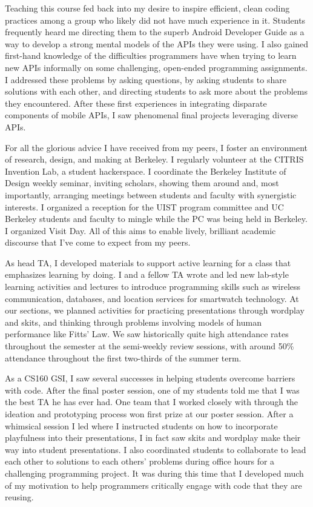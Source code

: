 \documentclass[12pt]{memoir}
\begin{document}
Teaching this course fed back into my desire to inspire efficient, clean coding practices among a group who likely did not have much experience in it.
Students frequently heard me directing them to the superb Android Developer Guide as a way to develop a strong mental models of the APIs they were using.
I also gained first-hand knowledge of the difficulties programmers have when trying to learn new APIs informally on some challenging, open-ended programming assignments.
I addressed these problems by asking questions, by asking students to share solutions with each other, and directing students to ask more about the problems they encountered.
After these first experiences in integrating disparate components of mobile APIs, I saw phenomenal final projects leveraging diverse APIs.

For all the glorious advice I have received from my peers, I foster an environment of research, design, and making at Berkeley.
I regularly volunteer at the CITRIS Invention Lab, a student hackerspace.
I coordinate the Berkeley Institute of Design weekly seminar, inviting scholars, showing them around and, most importantly, arranging meetings between students and faculty with synergistic interests.
I organized a reception for the UIST program committee and UC Berkeley students and faculty to mingle while the PC was being held in Berkeley.
I organized Visit Day.
All of this aims to enable lively, brilliant academic discourse that I've come to expect from my peers.

As head TA, I developed materials to support active learning for a class that emphasizes learning by doing.
I and a fellow TA wrote and led new lab-style learning activities and lectures to introduce programming skills such as wireless communication, databases, and location services for smartwatch technology.
At our sections, we planned activities for practicing presentations through wordplay and skits, and thinking through problems involving models of human performance like Fitts' Law.
We saw historically quite high attendance rates throughout the semester at the semi-weekly review sessions, with around 50\% attendance throughout the first two-thirds of the summer term.

As a CS160 GSI, I saw several successes in helping students overcome barriers with code.
After the final poster session, one of my students told me that I was the best TA he has ever had.
One team that I worked closely with through the ideation and prototyping process won first prize at our poster session.
After a whimsical session I led where I instructed students on how to incorporate playfulness into their presentations, I in fact saw skits and wordplay make their way into student presentations.
I also coordinated students to collaborate to lead each other to solutions to each others' problems during office hours for a challenging programming project.
It was during this time that I developed much of my motivation to help programmers critically engage with code that they are reusing.
\end{document}
